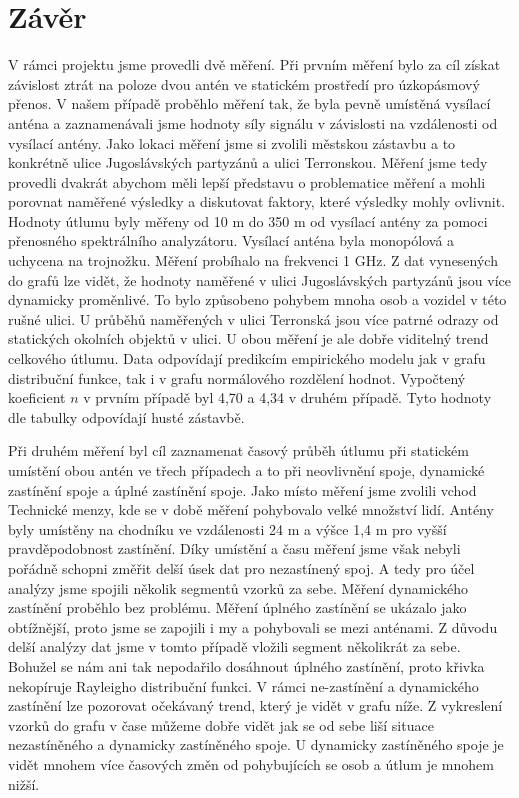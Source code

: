 \chapter*{Závěr} %
V rámci projektu jsme provedli dvě měření. Při prvním měření bylo za cíl získat závislost ztrát na poloze dvou antén ve statickém prostředí pro úzkopásmový přenos. V našem případě proběhlo měření tak, že byla pevně umístěná vysílací anténa a zaznamenávali jsme hodnoty síly signálu v závislosti na vzdálenosti od vysílací antény. Jako lokaci měření jsme si zvolili městskou zástavbu a to konkrétně ulice Jugoslávských partyzánů a ulici Terronskou. Měření jsme tedy provedli dvakrát abychom měli lepší představu o problematice měření a mohli porovnat naměřené výsledky a diskutovat faktory, které výsledky mohly ovlivnit.
Hodnoty útlumu byly měřeny od 10 m do 350 m od vysílací antény za pomoci přenosného spektrálního analyzátoru. Vysílací anténa byla monopólová a uchycena na trojnožku. Měření probíhalo na frekvenci 1 GHz. 
Z dat vynesených do grafů lze vidět, že hodnoty naměřené v ulici Jugoslávských partyzánů jsou více dynamicky proměnlivé. To bylo způsobeno pohybem mnoha osob a vozidel v této rušné ulici. U průběhů naměřených v ulici Terronská jsou více patrné odrazy od statických okolních objektů v ulici. U obou měření je ale dobře viditelný trend celkového útlumu. Data odpovídají predikcím empirického modelu jak v grafu distribuční funkce, tak i v grafu normálového rozdělení hodnot. Vypočtený koeficient $n$ v prvním případě byl 4,70 a 4,34 v druhém případě. Tyto hodnoty dle tabulky odpovídají husté zástavbě.

Při druhém měření byl cíl zaznamenat časový průběh útlumu při statickém umístění obou antén ve třech případech a to při neovlivnění spoje, dynamické zastínění spoje a úplné zastínění spoje. 
Jako místo měření jsme zvolili vchod Technické menzy, kde se v době měření pohybovalo velké množství lidí. Antény byly umístěny na chodníku ve vzdálenosti 24 m a výšce 1,4 m pro vyšší pravděpodobnost zastínění. 
Díky umístění a času měření jsme však nebyli pořádně schopni změřit delší úsek dat pro nezastínený spoj. A tedy pro účel analýzy jsme spojili několik segmentů vzorků za sebe. Měření dynamického zastínění proběhlo bez problému. Měření úplného zastínění se ukázalo jako obtížnější, proto jsme se zapojili i my a pohybovali se mezi anténami. Z důvodu delší analýzy dat jsme v tomto případě vložili segment několikrát za sebe.  Bohužel se nám ani tak nepodařilo dosáhnout úplného zastínění, proto křivka nekopíruje Rayleigho distribuční funkci.
V rámci ne-zastínění a dynamického zastínění lze pozorovat očekávaný trend, který je vidět v grafu níže.
Z vykreslení vzorků do grafu v čase můžeme dobře vidět jak se od sebe liší situace nezastíněného a dynamicky zastíněného spoje. U dynamicky zastíněného spoje je vidět mnohem více časových změn od pohybujících se osob a útlum je mnohem nižší.

